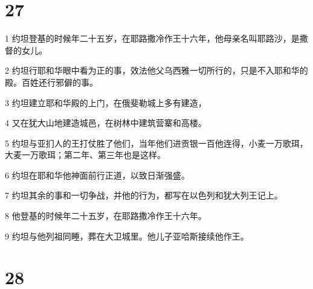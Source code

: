 \chapter{27}

\par 1 约坦登基的时候年二十五岁，在耶路撒冷作王十六年，他母亲名叫耶路沙，是撒督的女儿。
\par 2 约坦行耶和华眼中看为正的事，效法他父乌西雅一切所行的，只是不入耶和华的殿。百姓还行邪僻的事。
\par 3 约坦建立耶和华殿的上门，在俄斐勒城上多有建造，
\par 4 又在犹大山地建造城邑，在树林中建筑营寨和高楼。
\par 5 约坦与亚扪人的王打仗胜了他们，当年他们进贡银一百他连得，小麦一万歌珥，大麦一万歌珥；第二年、第三年也是这样。
\par 6 约坦在耶和华他神面前行正道，以致日渐强盛。
\par 7 约坦其余的事和一切争战，并他的行为，都写在以色列和犹大列王记上。
\par 8 他登基的时候年二十五岁，在耶路撒冷作王十六年。
\par 9 约坦与他列祖同睡，葬在大卫城里。他儿子亚哈斯接续他作王。

\chapter{28}

